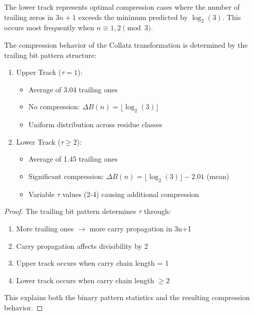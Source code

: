 \begin{corollary}
The lower track represents optimal compression cases where the number of trailing zeros in $3n+1$ exceeds the minimum predicted by $\log_2(3)$. This occurs most frequently when $n \equiv 1,2 \pmod{3}$.
\end{corollary}

\begin{theorem}
The compression behavior of the Collatz transformation is determined by the trailing bit pattern structure:
\begin{enumerate}
\item Upper Track ($\tau = 1$):
   \begin{itemize}
   \item Average of 3.04 trailing ones
   \item No compression: $\Delta B(n) = \lfloor \log_2(3) \rfloor$
   \item Uniform distribution across residue classes
   \end{itemize}
\item Lower Track ($\tau \geq 2$):
   \begin{itemize}
   \item Average of 1.45 trailing ones
   \item Significant compression: $\Delta B(n) = \lfloor \log_2(3) \rfloor - 2.01$ (mean)
   \item Variable $\tau$ values (2-4) causing additional compression
   \end{itemize}
\end{enumerate}
\end{theorem}

\begin{proof}
The trailing bit pattern determines $\tau$ through:
\begin{enumerate}
\item More trailing ones $\rightarrow$ more carry propagation in 3n+1
\item Carry propagation affects divisibility by 2
\item Upper track occurs when carry chain length = 1
\item Lower track occurs when carry chain length $\geq 2$
\end{enumerate}
This explains both the binary pattern statistics and the resulting compression behavior.
\end{proof} 